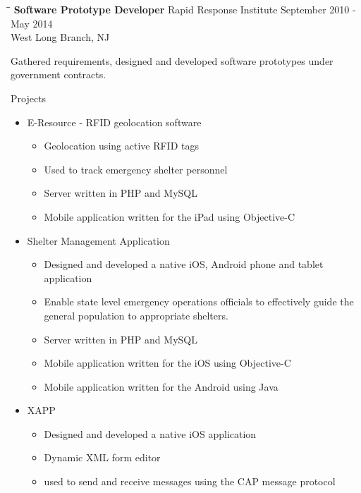 \documentclass{res}
\begin{document}
\begin{resume}
   \begin{tabbing}
   \hspace{2.3in}\= \hspace{2.6in}\= \kill %
    {\bf Software Prototype Developer} \>Rapid Response Institute     \>September 2010 - May 2014\\
                             \>West Long Branch, NJ
   \end{tabbing}\vspace{-20pt}      %
   Gathered requirements, designed and developed software prototypes under government contracts.

    Projects
    \begin{itemize}
        \item E-Resource - RFID geolocation software
        \begin{itemize}
            \item Geolocation using active RFID tags
            \item Used to track emergency shelter personnel
            \item Server written in PHP and MySQL
            \item Mobile application written for the iPad using Objective-C
        \end{itemize}
        \item Shelter Management Application
        \begin{itemize}
            \item Designed and developed a native iOS, Android phone and tablet application
            \item Enable state level emergency operations officials to effectively guide the general population to appropriate shelters.
            \item Server written in PHP and MySQL
            \item Mobile application written for the iOS using Objective-C
            \item Mobile application written for the Android using Java
        \end{itemize}
        \item XAPP
        \begin{itemize}
            \item Designed and developed a native iOS application
            \item Dynamic XML form editor
            \item used to send and receive messages using the CAP message protocol

\end{itemize}
\end{itemize}
\end{resume}
\end{document}
